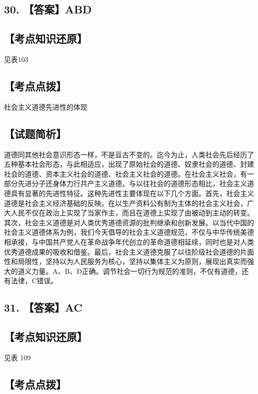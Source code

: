 \documentclass[UTF8,11pt]{ctexart}
\begin{document}
\subsection*{30. 【答案】ABD}

\subsection*{【考点知识还原】}

见表103


\subsection*{【考点点拨】}

社会主义道德先进性的体现


\subsection*{【试题简析】}

道德同其他社会意识形态一样，不是亘古不变的。迄今为止，人类社会先后经历了五种基本社会形态，与此相适应，出现了原始社会的道德、奴隶社会的道德、封建社会的道德、资本主义社会的道德、社会主义社会的道德。在社会主义社会，有一部分先进分子还身体力行共产主义道德。与以往社会的道德形态相比，社会主义道德具有显著的先进性特征。这种先进性主要体现在以下几个方面。首先，社会主义道德是社会主义经济基础的反映。在以生产资料公有制为主体的社会主义社会，广大人民不仅在政治上实现了当家作主，而且在道德上实现了由被动到主动的转变。其次，社会主义道德是对人类优秀道德资源的批判继承和创新发展。以当代中国的社会主义道德体系为例，我们今天倡导的社会主义道德规范，不仅与中华传统美德相承接，与中国共产党人在革命战争年代创立的革命道德相延续，同时也是对人类优秀道德成果的吸收和借鉴。最后，社会主义道德克服了以往阶级社会道德的片面性和局限性，坚持以为人民服务为核心，坚持以集体主义为原则，展现出真实而强大的道义力量。A、B、D正确。调节社会一切行为规范的准则，不仅有道德，还有法律，C错误。


\subsection*{31. 【答案】AC}

\subsection*{【考点知识还原】}

见表 109


\subsection*{【考点点拨】}
\end{document}
